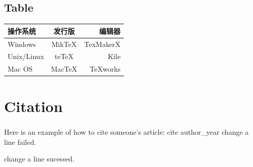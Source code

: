\documentclass[12pt]{ctexart}
\begin{document}

\hskip 5pt

\subsection{Table}
\begin{tabular}{|l|c|r|}
    \hline
    操作系统&发行版&编辑器\\
    \hline
    Windows&MikTeX&TexMakerX\\
    \hline
    Unix/Linux&teTeX&Kile\\
    \hline
    Mac OS&MacTeX&TeXworks\\
    \hline
\end{tabular}
\section{Citation}
Here is an example of how to cite someone's article: cite author\_year\textsuperscript{\cite{author_2021}}
change a line failed.

change a line sucessed.


\end{document}

